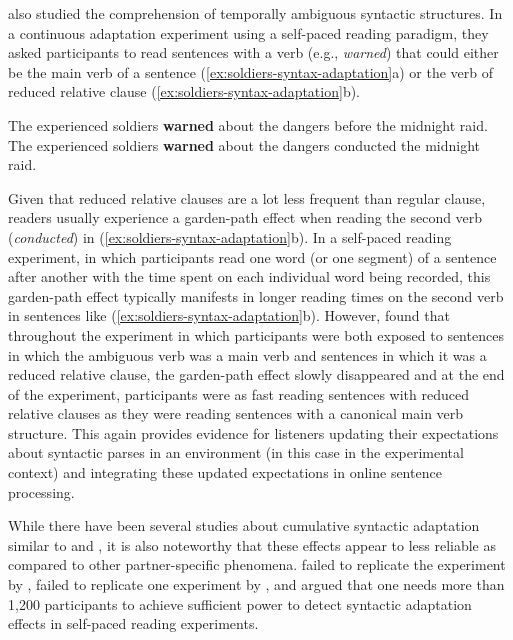 \textcite{Fine2013} also studied the comprehension of temporally ambiguous syntactic structures. In a continuous adaptation experiment using a self-paced reading paradigm,
they asked participants to read sentences with a verb (e.g., \textit{warned}) that could either be the main verb of a sentence (\ref{ex:soldiers-syntax-adaptation}a) or the verb of reduced relative clause (\ref{ex:soldiers-syntax-adaptation}b).
\begin{exe}
\ex \begin{xlist} \label{ex:soldiers-syntax-adaptation}
\ex The experienced soldiers \textbf{warned} about the dangers before the midnight raid.
\ex The experienced soldiers \textbf{warned} about the dangers conducted the midnight raid.
\end{xlist}
\end{exe}
\noindent Given that reduced relative clauses are a lot less frequent than regular clause, readers usually experience a garden-path effect 
when reading the second verb (\textit{conducted}) in (\ref{ex:soldiers-syntax-adaptation}b). In a self-paced reading experiment, in which 
participants read one word (or one segment) of a sentence after another with the time spent on each individual word being recorded,
this garden-path effect typically manifests in longer reading times on the second verb in sentences like (\ref{ex:soldiers-syntax-adaptation}b).
However, \textcite{Fine2013} found that throughout the experiment in which participants were both exposed to sentences in which the ambiguous verb
was a main verb and sentences in which it was a reduced relative clause, the garden-path effect slowly disappeared and at the end of the experiment,
participants were as fast reading sentences with reduced relative clauses as they were reading sentences with a canonical main verb structure.
This again provides evidence for listeners updating their expectations about syntactic parses in an environment (in this case in the experimental context)
and integrating these updated expectations in online sentence processing.

While there have been several studies about cumulative syntactic adaptation similar to \textcite{Kamide2012} and \textcite{Fine2013}, it is also noteworthy
that these effects appear to less reliable as compared to other partner-specific phenomena. \textcite{Liu2017} failed to replicate the experiment by \textcite{Kamide2012}, 
\cite{HarringtonStack2018} failed to replicate one experiment by  \textcite{Fine2013}, and \textcite{Prasad2020} argued that one needs more than 1,200
participants to achieve sufficient power to detect syntactic adaptation effects in self-paced reading experiments.

